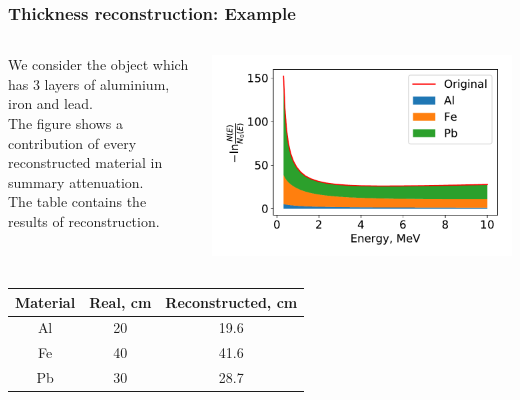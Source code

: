 \documentclass[11pt]{beamer}
\begin{document}
 \begin{frame}
    \frametitle{Thickness reconstruction: Example}
    \begin{columns}
        \begin{column}{0.4\textwidth}
          We consider the object which has 3 layers of aluminium, iron and lead.\\
          The figure shows a contribution of every reconstructed material in summary attenuation. \\
          The table contains the results of reconstruction.
         
        \end{column}
        \begin{column}{0.7\textwidth} 
            \includegraphics[width=1\textwidth]{figures/reconstruction.pdf}
        \end{column}
    \end{columns}  
\begin{columns}
        \begin{column}{0.5\textwidth}
    
    
    \begin{tabular}[c]{|c|c|c|}
        \hline 
        Material & Real, cm & Reconstructed, cm \\ 
        \hline 
        Al & 20 & 19.6 \\ 
        \hline 
        Fe & 40 & 41.6 \\ 
        \hline 
        Pb & 30 & 28.7 \\ 
        \hline 
    \end{tabular}
    
\end{column}
\end{columns}  
\end{frame}
\end{document}
